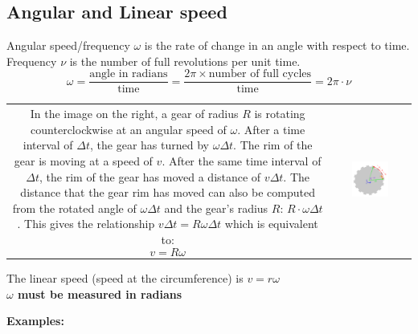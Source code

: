 \documentclass{article}
\begin{document}
\subsection{Angular and Linear speed}

Angular speed/frequency \(\omega\) is the rate of change in an angle with respect to time. Frequency \(\nu\) is the number of full revolutions per unit time. 
\[\omega = \frac{\text{angle in radians}}{\text{time}} = \frac{2\pi \times \text{number of full cycles}}{\text{time}} =  2\pi \cdot \nu\]

\begin{tabular}{cc}
\parbox{0.5\textwidth}{
In the image on the right, a gear of radius \(R\) is rotating counterclockwise at an angular speed of \(\omega\). After a time interval of \(\Delta t\), the gear has turned by \(\omega \Delta t\). The rim of the gear is moving at a speed of \(v\). After the same time interval of \(\Delta t\), the rim of the gear has moved a distance of \(v\Delta t\). The distance that the gear rim has moved can also be computed from the rotated angle of \(\omega \Delta t\) and the gear's radius \(R\): \(R \cdot \omega \Delta t\). This gives the relationship \(v \Delta t = R \omega \Delta t\) which is equivalent to:
\[v = R \omega\]
} & \parbox{0.5\textwidth}{
\includegraphics[width = 0.5\textwidth]{spinning_gear}
}
\end{tabular}




The linear speed (speed at the circumference) is \(v = r\omega\) \\ {\bf \(\omega\) must be measured in radians}

\textbf{Examples:}
\end{document}
